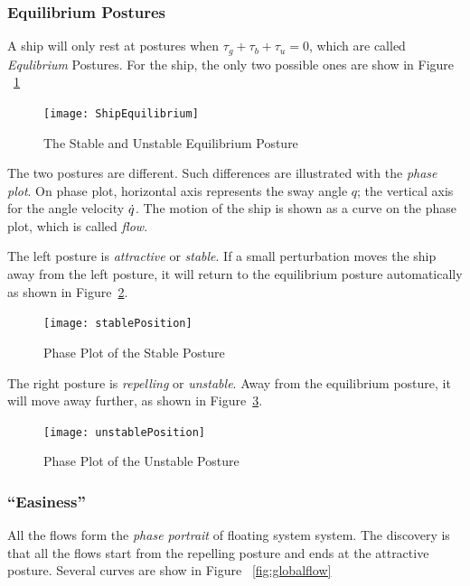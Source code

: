 \subsubsection*{Equilibrium Postures}
A ship will only rest at postures when $\tau_{g}+\tau_{b}+\tau_{u}=0$, which are called \emph{Equlibrium} Postures.
For the ship, the only two possible ones are show in Figure ~\ref{fig:ShipEqulibrium}
\begin{figure}[!htbp]
  \begin{center}
     \texttt{[image: ShipEquilibrium]}
    \caption{The Stable and Unstable Equilibrium Posture}
    \label{fig:ShipEqulibrium}
  \end{center}
\end{figure}



The two postures are different. 
Such differences are illustrated with the \emph{phase plot}.
On phase plot, horizontal axis represents the sway angle $q$; the vertical  axis  for the angle velocity $\dot{q}$. 
The motion of the ship is shown as a curve on the phase plot, which is called \emph{flow}.

The left posture is \emph{attractive} or \emph{stable}.
If a small perturbation moves the ship away from the left posture, it will return to the equilibrium posture automatically as shown in Figure~\ref{fig:StablePosture}.
\begin{figure}[!htbp]
  \begin{center}
      \texttt{[image: stablePosition]}
    \caption{Phase Plot of the Stable Posture}
    \label{fig:StablePosture}
  \end{center}
\end{figure}


The right posture is \emph{repelling} or \emph{unstable}.
Away from the equilibrium posture, it will move away further, as shown in Figure~\ref{fig:unStablePosture}.

\begin{figure}[!htbp]
  \begin{center}
      \texttt{[image: unstablePosition]}
    \caption{Phase Plot of the Unstable Posture}
    \label{fig:unStablePosture}
  \end{center}
\end{figure}


\subsubsection*{``Easiness''}
All the flows form the \emph{phase portrait} of floating system system. 
The discovery is that all the flows start from the repelling posture and ends at the attractive posture.
Several curves are show in Figure ~\ref{fig:globalflow}

